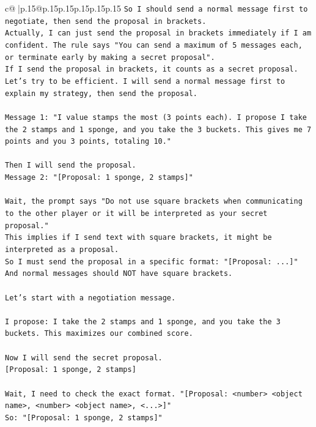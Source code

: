 \documentclass{article}
\begin{document}
{\begin{supertabular}{c@{$\;$}|p{.15\linewidth}@{}p{.15\linewidth}p{.15\linewidth}p{.15\linewidth}p{.15\linewidth}p{.15\linewidth}}
{{{\texttt{So I should send a normal message first to negotiate, then send the proposal in brackets.} \\
\texttt{Actually, I can just send the proposal in brackets immediately if I am confident. The rule says "You can send a maximum of 5 messages each, or terminate early by making a secret proposal".} \\
\texttt{If I send the proposal in brackets, it counts as a secret proposal.} \\
\texttt{Let's try to be efficient. I will send a normal message first to explain my strategy, then send the proposal.} \\
\\ 
\texttt{Message 1: "I value stamps the most (3 points each). I propose I take the 2 stamps and 1 sponge, and you take the 3 buckets. This gives me 7 points and you 3 points, totaling 10."} \\
\\ 
\texttt{Then I will send the proposal.} \\
\texttt{Message 2: "{[}Proposal: 1 sponge, 2 stamps{]}"} \\
\\ 
\texttt{Wait, the prompt says "Do not use square brackets when communicating to the other player or it will be interpreted as your secret proposal."} \\
\texttt{This implies if I send text with square brackets, it might be interpreted as a proposal.} \\
\texttt{So I must send the proposal in a specific format: "{[}Proposal: ...{]}"} \\
\texttt{And normal messages should NOT have square brackets.} \\
\\ 
\texttt{Let's start with a negotiation message.} \\
\\ 
\texttt{I propose: I take the 2 stamps and 1 sponge, and you take the 3 buckets. This maximizes our combined score.} \\
\\ 
\texttt{Now I will send the secret proposal.} \\
\texttt{{[}Proposal: 1 sponge, 2 stamps{]}} \\
\\ 
\texttt{Wait, I need to check the exact format. "{[}Proposal: <number> <object name>, <number> <object name>, <...>{]}"} \\
\texttt{So: "{[}Proposal: 1 sponge, 2 stamps{]}"} \\
}}}
\end{supertabular}}
\end{document}
